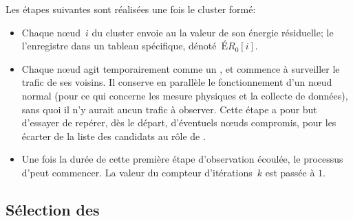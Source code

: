 Les étapes suivantes sont réalisées une fois le cluster formé:
\begin{itemize}
    \item Chaque nœud~$i$ du cluster envoie au \ch la valeur de son énergie résiduelle; le \CH l'enregistre dans un tableau spécifique, dénoté~$\mathit{ÉR}_0[i]$.
    \item Chaque nœud agit temporairement comme un \cn, et commence à surveiller le trafic de ses voisins. Il conserve en parallèle le fonctionnement d'un nœud normal (pour ce qui concerne les mesure physiques et la collecte de données), sans quoi il n'y aurait aucun trafic à observer. Cette étape a pour but d'essayer de repérer, dès le départ, d'éventuels nœuds compromis, pour les écarter de la liste des candidats au rôle de \cn.
    \item Une fois la durée de cette première étape d'observation écoulée, le processus d'\elecdem peut commencer. La valeur du compteur d'itérations~$k$ est passée à $1$.
\end{itemize}

    \subsection{Sélection des \cns}


